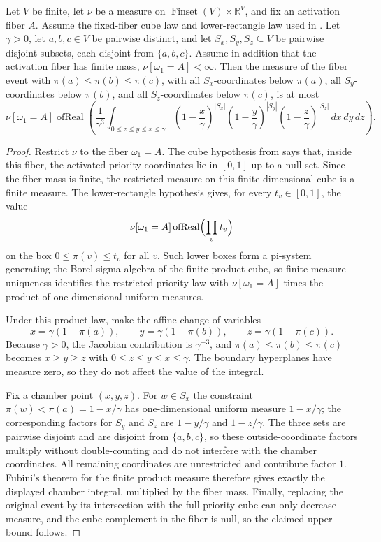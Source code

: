 \begin{helper}
Let \(V\) be finite, let \(\nu\) be a measure on
\(\operatorname{Finset}(V)\times \mathbb R^V\), and fix an activation fiber
\(A\).  Assume the fixed-fiber cube law and lower-rectangle law used in
.  Let \(\gamma>0\), let
\(a,b,c\in V\) be pairwise distinct, and let \(S_x,S_y,S_z\subseteq V\) be
pairwise disjoint subsets, each disjoint from \(\{a,b,c\}\).  Assume in
addition that the activation fiber has finite mass,
\(\nu[\omega_1=A]<\infty\).  Then the measure of the fiber event with
\(\pi(a)\le\pi(b)\le\pi(c)\), with all \(S_x\)-coordinates below
\(\pi(a)\), all \(S_y\)-coordinates below \(\pi(b)\), and all
\(S_z\)-coordinates below \(\pi(c)\), is at most
\[
\nu[\omega_1=A]\operatorname{ofReal}\left(
\frac{1}{\gamma^3}
\int_{0\le z\le y\le x\le\gamma}
\left(1-\frac{x}{\gamma}\right)^{|S_x|}
\left(1-\frac{y}{\gamma}\right)^{|S_y|}
\left(1-\frac{z}{\gamma}\right)^{|S_z|}\,dx\,dy\,dz\right).
\]
\end{helper}
\begin{proof}
Restrict \(\nu\) to the fiber \(\omega_1=A\).  The cube hypothesis from
 says that, inside this fiber, the
activated priority coordinates lie in \([0,1]\) up to a null set.  Since the
fiber mass is finite, the restricted measure on this finite-dimensional cube
is a finite measure.  The lower-rectangle hypothesis gives, for every
\(t_v\in[0,1]\), the value
\[
\nu[\omega_1=A]\operatorname{ofReal}\Bigl(\prod_v t_v\Bigr)
\]
on the box \(0\le \pi(v)\le t_v\) for all \(v\).  Such lower boxes form a
pi-system generating the Borel sigma-algebra of the finite product cube, so
finite-measure uniqueness identifies the restricted priority law with
\(\nu[\omega_1=A]\) times the product of one-dimensional uniform measures.

Under this product law, make the affine change of variables
\[
x=\gamma(1-\pi(a)),\qquad y=\gamma(1-\pi(b)),\qquad
z=\gamma(1-\pi(c)).
\]
Because \(\gamma>0\), the Jacobian contribution is \(\gamma^{-3}\), and
\(\pi(a)\le\pi(b)\le\pi(c)\) becomes \(x\ge y\ge z\) with
\(0\le z\le y\le x\le\gamma\).  The boundary hyperplanes have measure zero,
so they do not affect the value of the integral.

Fix a chamber point \((x,y,z)\).  For \(w\in S_x\) the constraint
\(\pi(w)<\pi(a)=1-x/\gamma\) has one-dimensional uniform measure
\(1-x/\gamma\); the corresponding factors for \(S_y\) and \(S_z\) are
\(1-y/\gamma\) and \(1-z/\gamma\).  The three sets are pairwise disjoint and
are disjoint from \(\{a,b,c\}\), so these outside-coordinate factors multiply
without double-counting and do not interfere with the chamber coordinates.
All remaining coordinates are unrestricted and contribute factor \(1\).
Fubini's theorem for the finite product measure therefore gives exactly the
displayed chamber integral, multiplied by the fiber mass.  Finally, replacing
the original event by its intersection with the full priority cube can only
decrease measure, and the cube complement in the fiber is null, so the claimed
upper bound follows.
\end{proof}
